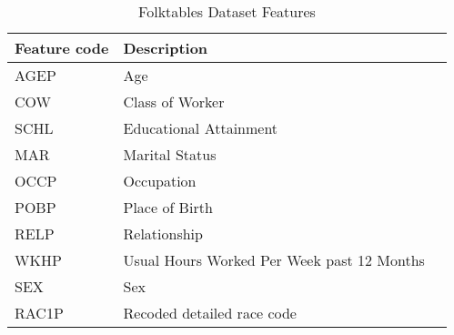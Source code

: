 \begin{table}[h]
\centering
\caption{Folktables Dataset Features}
\label{tab:folktables-variables}
\begin{tabular}{lll}
\hline
\textbf{Feature code} & \textbf{Description} \\
\hline
AGEP & Age \\
COW & Class of Worker \\
SCHL & Educational Attainment \\
MAR & Marital Status \\
OCCP & Occupation \\
POBP & Place of Birth \\
RELP & Relationship \\
WKHP & Usual Hours Worked Per Week past 12 Months \\
SEX & Sex \\
RAC1P & Recoded detailed race code \\
\hline
\end{tabular}
\end{table}